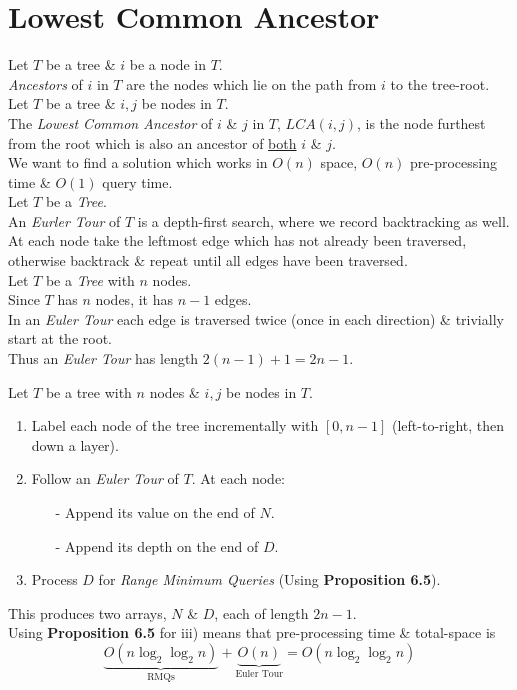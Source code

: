 \documentclass[11pt,a4paper]{article}
\begin{document}
\section{Lowest Common Ancestor}

Let $T$ be a tree \& $i$ be a node in $T$.\\
\textit{Ancestors} of $i$ in $T$ are the nodes which lie on the path from $i$ to the tree-root.\\

Let $T$ be a tree \& $i,j$ be nodes in $T$.\\
The \textit{Lowest Common Ancestor} of $i$ \& $j$ in $T$, $LCA(i,j)$, is the node furthest from the root which is also an ancestor of \underline{both} $i$ \& $j$.\\

We want to find a solution which works in $O(n)$ space, $O(n)$ pre-processing time \& $O(1)$ query time.\\

Let $T$ be a \textit{Tree}.\\
An \textit{Eurler Tour} of $T$ is a depth-first search, where we record backtracking as well.\\
At each node take the leftmost edge which has not already been traversed, otherwise backtrack \& repeat until all edges have been traversed.\\

Let $T$ be a \textit{Tree} with $n$ nodes.\\
Since $T$ has $n$ nodes, it has $n-1$ edges.\\
In an \textit{Euler Tour} each edge is traversed twice (once in each direction) \& trivially start at the root.\\
Thus an \textit{Euler Tour} has length $2(n-1)+1=2n-1$.\\


Let $T$ be a tree with $n$ nodes \& $i,j$ be nodes in $T$.
\begin{enumerate}
	\item Label each node of the tree incrementally with $[0,n-1]$ (left-to-right, then down a layer).
	\item Follow an \textit{Euler Tour} of $T$. At each node:
	\begin{itemize}
		\item[-] Append its value on the end of $N$.
		\item[-] Append its depth on the end of $D$.
	\end{itemize}
	\item Process $D$ for \textit{Range Minimum Queries} (Using \textbf{Proposition 6.5}).
\end{enumerate}
This produces two arrays, $N$ \& $D$, each of length $2n-1$.\\
Using \textbf{Proposition 6.5} for iii) means that pre-processing time \& total-space is
$$\underbrace{O(n\log_2\log_2n)}_\text{RMQs}+\underbrace{O(n)}_\text{Euler Tour}=O(n\log_2\log_2n)$$
\end{document}
